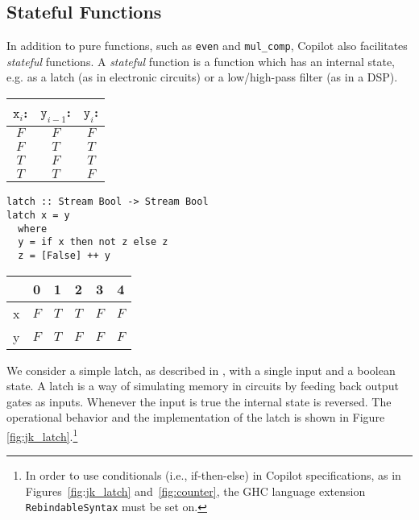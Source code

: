 \subsection{Stateful Functions} \label{sec:stateful}

In addition to pure functions, such as {\tt even} and {\tt mul\_comp},
Copilot also facilitates \emph{stateful} functions. A \emph{stateful} function
is a function which has an internal state, e.g. as a latch (as in electronic
circuits) or a low/high-pass filter (as in a DSP).

\begin{figure*}
\begin{minipage}{0.25\linewidth}
\begin{tabular}{c|c||c}
$\mathtt{x}_i$: & $\mathtt{y}_{i-1}$: & $\mathtt{y}_i$:\\
\hline
$F$ & $F$ & $F$ \\
\hline
$F$ & $T$ & $T$ \\
\hline
$T$ & $F$ & $T$ \\
\hline
$T$ & $T$ & $F$
\end{tabular}
\end{minipage}
\begin{minipage}{0.35\linewidth}
\begin{lstlisting}[frame=none]
latch :: Stream Bool -> Stream Bool
latch x = y
  where
  y = if x then not z else z
  z = [False] ++ y
\end{lstlisting}
\end{minipage}
\hspace{1cm}
\begin{minipage}{0.3\linewidth}
\begin{tabular}{c|c|c|c|c|c}
   & 0 & 1 & 2 & 3 & 4\\
\hline
x & $F$ & $T$ & $T$ & $F$ & $F$ \\
\hline
y & $F$ & $T$ & $F$ & $F$ & $F$ \\
\end{tabular}
\end{minipage}
\caption{A latch [Example 3]. The specification function is provided at the left and the
implementation in copilot is provided in the middle. The right shows an example of
the latch, where x is $\{F, T, T, F, F, \dots \}$ and the initial value of y (used with $x_0$ to find
$y_0$ since there is no $y_{-1}$) is False.}
\label{fig:jk_latch}
\end{figure*}

\begin{example}
We consider a simple latch, as described in \cite{Farhat2004}, with a single
input and a boolean state. A latch is a way of simulating memory in circuits by feeding
back output gates as inputs.  Whenever the input is true the internal state is reversed.
The operational behavior and the implementation of the latch is shown in Figure
\ref{fig:jk_latch}.\footnote
{In order
to use conditionals (i.e., if-then-else) in Copilot specifications,
as in Figures~\ref{fig:jk_latch} and~\ref{fig:counter}, the GHC
language extension {\tt RebindableSyntax} must be set on.}
\end{example}

